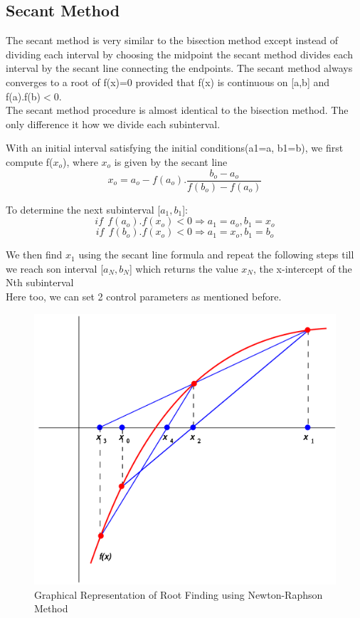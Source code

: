 \documentclass[11pt]{article}
\begin{document}
\subsection{Secant Method}
The secant method is very similar to the bisection method except instead of dividing each interval by choosing the midpoint the secant method divides each interval by the secant line connecting the endpoints. The secant method always converges to a root of f(x)=0 provided that f(x) is continuous on [a,b] and f(a).f(b)$<$0.\\

The secant method procedure is almost identical to the bisection method. The only difference it how we divide each subinterval.

With an initial interval satisfying the initial conditions(a1=a, b1=b), we first compute f($x_o$), where $x_o$ is given by the secant line \[ x_o = a_o - f(a_o).\frac{b_o - a_o}{f(b_o) - f(a_o)}\]

To determine the next subinterval [$a_1, b_1$]:
\[if~~ f(a_o).f(x_o)<0 \Rightarrow a_1=a_o, b_1=x_o\]
\[if~~ f(b_o).f(x_o)<0 \Rightarrow a_1=x_o, b_1=b_o\]

We then find $x_1$ using the secant line formula and repeat the following steps till we reach son interval [$a_N, b_N$] which returns the value $x_N$, the x-intercept of the Nth subinterval\\

Here too, we can set 2 control parameters as mentioned before.

\begin{figure}[h!]
	\centering
	\centering
	\includegraphics[width=0.6\linewidth]{secm1}
	\caption{Graphical Representation of Root Finding using Newton-Raphson Method}
	\label{fig3}
\end{figure}
\end{document}
